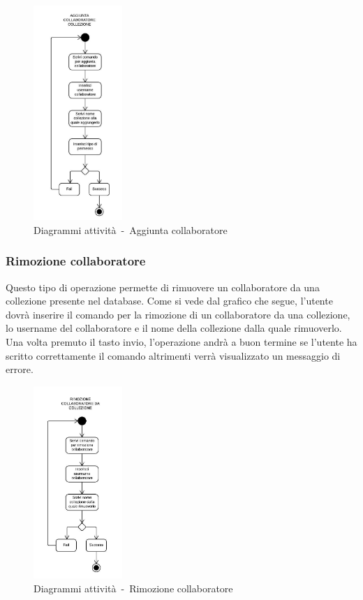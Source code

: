 \documentclass{scalatekids-article}
\begin{document}
\begin{figure}[H]
  \begin{center}
    \includegraphics[width=0.3\textwidth, keepaspectratio]{img/diagrammiAttivita/aggCollaboratore.jpeg}
    \caption{Diagrammi attività\ -\ Aggiunta collaboratore}
  \end{center}
\end{figure}

\subsubsection{Rimozione collaboratore}

Questo tipo di operazione permette di rimuovere un collaboratore da una
collezione presente nel database. Come si vede dal grafico che segue, l'utente
dovrà inserire il comando per la rimozione di un collaboratore da una
collezione, lo username del collaboratore e il nome della collezione dalla
quale rimuoverlo. Una volta premuto il tasto invio, l'operazione andrà a buon
termine se l'utente ha scritto correttamente il comando altrimenti verrà
visualizzato un messaggio di errore.

\begin{figure}[H]
  \begin{center}
    \includegraphics[width=0.3\textwidth, keepaspectratio]{img/diagrammiAttivita/rimozioneCollaboratore.jpeg}
    \caption{Diagrammi attività\ -\ Rimozione collaboratore}
  \end{center}
\end{figure}
\end{document}
